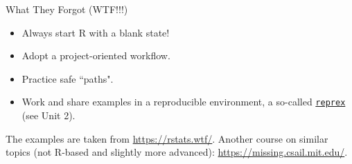 \documentclass[
hyperref={bookmarks=false},
xcolor={dvipsnames,svgnames*,x11names*}, 
12pt
]{beamer}
\begin{document}
\begin{frame}{What They Forgot (WTF!!!)}
\vspace{-0.75cm}
\begin{itemize}
\itemsep 2ex
\item Always start R with a blank state!
\item Adopt a project-oriented workflow. 
\item Practice safe ``paths". 
\item Work and share examples in a reproducible environment, a so-called \href{https://reprex.tidyverse.org/}{\texttt{reprex}} (see Unit 2). 	
\end{itemize}

\vspace{0.5cm}

The examples are taken from \url{https://rstats.wtf/}. Another course on similar topics (not R-based and slightly more advanced): \url{https://missing.csail.mit.edu/}. 
\end{frame}



\end{document}
